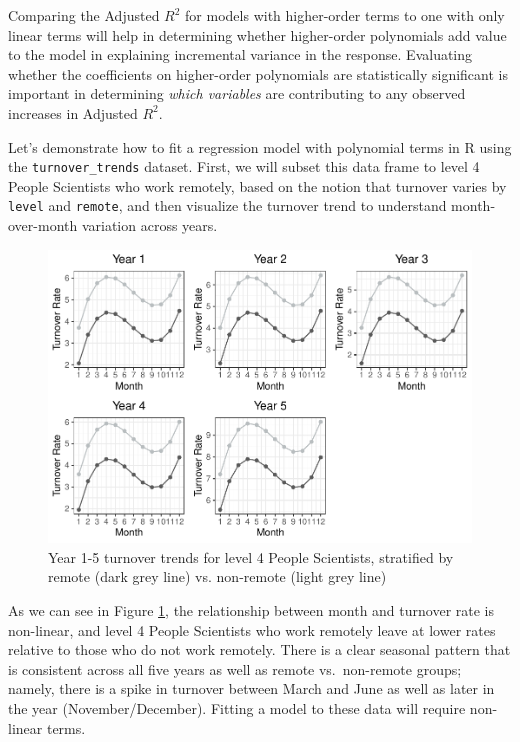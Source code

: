 \documentclass[
]{book}
\begin{document}
Comparing the Adjusted \(R^2\) for models with higher-order terms to one with only linear terms will help in determining whether higher-order polynomials add value to the model in explaining incremental variance in the response. Evaluating whether the coefficients on higher-order polynomials are statistically significant is important in determining \emph{which variables} are contributing to any observed increases in Adjusted \(R^2\).

Let's demonstrate how to fit a regression model with polynomial terms in R using the \texttt{turnover\_trends} dataset. First, we will subset this data frame to level 4 People Scientists who work remotely, based on the notion that turnover varies by \texttt{level} and \texttt{remote}, and then visualize the turnover trend to understand month-over-month variation across years.

\begin{figure}

{\centering \includegraphics[width=1\linewidth]{The_Fundamentals_of_People_Analytics_files/figure-latex/ps-turnover-trends-1} 

}

\caption{Year 1-5 turnover trends for level 4 People Scientists, stratified by remote (dark grey line) vs. non-remote (light grey line)}\label{fig:ps-turnover-trends}
\end{figure}

As we can see in Figure \ref{fig:ps-turnover-trends}, the relationship between month and turnover rate is non-linear, and level 4 People Scientists who work remotely leave at lower rates relative to those who do not work remotely. There is a clear seasonal pattern that is consistent across all five years as well as remote vs.~non-remote groups; namely, there is a spike in turnover between March and June as well as later in the year (November/December). Fitting a model to these data will require non-linear terms.
\end{document}
